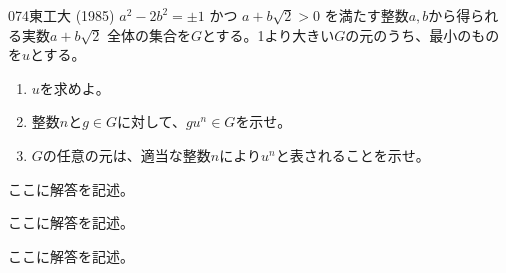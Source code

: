 \begin{prob}{074}{\maru}{東工大 (1985)}
 $a^2-2b^2=\pm 1$ かつ $a+b\sqrt{2}>0$ を満たす整数$a, b$から得られる実数$a+b\sqrt{2}$ 全体の集合を$G$とする。1より大きい$G$の元のうち、最小のものを$u$とする。
 \begin{enumerate}
  \item $u$を求めよ。
  \item 整数$n$と$g\in G$に対して、$gu^n\in G$を示せ。
  \item $G$の任意の元は、適当な整数$n$により$u^n$と表されることを示せ。
 \end{enumerate}
\end{prob}
ここに解答を記述。

ここに解答を記述。

ここに解答を記述。